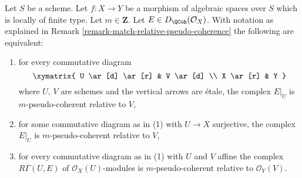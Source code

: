 \begin{lemma}
\label{lemma-qcoh-relative-pseudo-coherence-characterize}
Let $S$ be a scheme. Let $f : X \to Y$ be a morphism of algebraic spaces
over $S$ which is locally of finite type. Let $m \in \mathbf{Z}$.
Let $E \in D_\QCoh(\mathcal{O}_X)$. With notation as explained in
Remark \ref{remark-match-relative-pseudo-coherence}
the following are equivalent:
\begin{enumerate}
\item for every commutative diagram
$$
\xymatrix{
U \ar[d] \ar[r] & V \ar[d] \\
X \ar[r] & Y
}
$$
where $U$, $V$ are schemes and the vertical arrows are \'etale, the complex
$E|_U$ is $m$-pseudo-coherent relative to $V$,
\item for some commutative diagram as in (1) with $U \to X$
surjective, the complex $E|_U$ is $m$-pseudo-coherent relative to $V$,
\item for every commutative diagram as in (1) with $U$ and $V$
affine the complex $R\Gamma(U, E)$ of $\mathcal{O}_X(U)$-modules
is $m$-pseudo-coherent relative to $\mathcal{O}_Y(V)$.
\end{enumerate}
\end{lemma}

